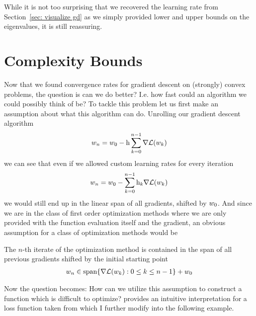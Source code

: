 While it is not too surprising that we recovered the learning rate from
Section~\ref{sec: visualize gd} as we simply provided lower and upper bounds on
the eigenvalues, it is still reassuring. 

\section{Complexity Bounds}\label{sec: complexity bounds}

Now that we found convergence rates for gradient descent on (strongly) convex
problems, the question is can we do better? I.e. how fast could an algorithm we
could possibly think of be? To tackle this problem let us first make an
assumption about what this algorithm can do.
Unrolling our gradient descent algorithm
%
\begin{align*}
	w_n = w_0 - \text{h}\sum_{k=0}^{n-1} \nabla \mathcal{L}(w_k)
\end{align*}
%
we can see that even if we allowed custom learning rates for every iteration
%
\begin{align*}
	w_n = w_0 - \sum_{k=0}^{n-1} \text{h}_k \nabla \mathcal{L}(w_k)
\end{align*}
%
we would still end up in the linear span of all gradients, shifted by \(w_0\).
And since we are in the class of first order optimization methods where we are
only provided with the function evaluation itself and the gradient, an obvious
assumption for a class of optimization methods would be
%
\begin{assumption}
	\label{assmpt: parameter in linear hull of gradients}
	The \(n\)-th iterate of the optimization method is contained in the span of all
	previous gradients shifted by the initial starting point
	\begin{align*}
		w_n \in \text{span}\{\nabla \mathcal{L}(w_k) : 0\le k \le n-1\} + w_0
	\end{align*}
\end{assumption}
%
Now the question becomes: How can we utilize this assumption to construct a
function which is difficult to optimize?
\textcite{gohWhyMomentumReally2017} provides an intuitive interpretation for a loss
function taken from \textcite[Section 2.1.2]{nesterovLecturesConvexOptimization2018}
which I further modify into the following example.

